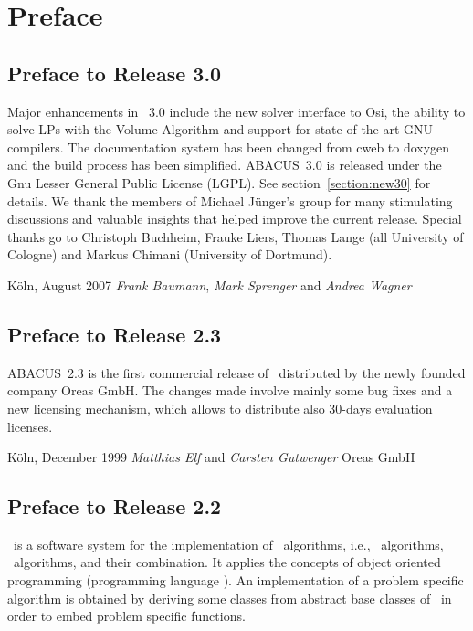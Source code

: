 
\chapter{Preface}

\section*{Preface to Release 3.0}

Major enhancements in \ABACUS~3.0 include the new solver interface to Osi, the ability to solve LPs with the Volume Algorithm and support for state-of-the-art GNU compilers. The documentation system has been changed from cweb to doxygen and the build process has been simplified.
ABACUS~3.0 is released under the Gnu Lesser General Public License (LGPL). 
See section~\ref{section:new30} for details. \newline
We thank the members of Michael J\"unger's group for many stimulating
discussions and valuable insights that helped improve the current
release. Special thanks go to Christoph Buchheim, Frauke Liers,
Thomas Lange (all University of Cologne) and Markus Chimani 
(University of Dortmund).
    

\bigskip
\bigskip\noindent
{K\"oln, August 2007 \hfill {\it Frank Baumann}, {\it Mark Sprenger} and {\it Andrea Wagner}}\newline

\section*{Preface to Release 2.3}

ABACUS~2.3 is the first commercial release of
\ABACUS\ distributed by the newly founded company Oreas GmbH. The
changes made involve mainly some bug fixes and a new
licensing mechanism, which allows to distribute also 30-days
evaluation licenses.


\bigskip
\bigskip\noindent
{K\"oln, December 1999 \hfill {\it Matthias Elf} and {\it Carsten
Gutwenger}}\newline
\smallskip
{\hfill Oreas GmbH}



\section*{Preface to Release 2.2}

\ABACUS\ is a software system for the implementation of \lpbab\
algorithms, i.e., \bac\ algorithms, \bap\ algorithms, and their
combination. It applies the concepts of object oriented programming
(programming language \CPLUSPLUS). An implementation of a problem
specific algorithm is obtained by deriving some classes from abstract
base classes of \ABACUS\ in order to embed problem specific functions.


